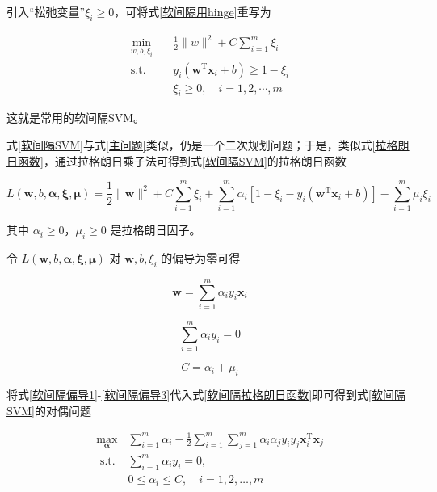 \documentclass{ctexart}
\begin{document}
	引入“松弛变量”$\xi_i\geqslant 0$，可将式\eqref{软间隔用hinge}重写为
	
	\begin{equation}
		\begin{aligned}
			\min _{w, b, \xi_{i}}\quad&\frac{1}{2}\|w\|^{2}+C \sum_{i=1}^{m} \xi_{i}\\
			\text{s.t.}\quad&y_i\left(\boldsymbol{w}^{\mathrm{T}}\boldsymbol{x}_i+b\right)\geqslant 1-\xi_i\\
			&\xi_{i}\geqslant0,\quad i=1,2,\cdots,m
		\end{aligned}
		\label{软间隔SVM}
	\end{equation}
	
	这就是常用的软间隔SVM。
	
	式\eqref{软间隔SVM}与式\eqref{主问题}类似，仍是一个二次规划问题；于是，类似式\eqref{拉格朗日函数}，通过拉格朗日乘子法可得到式\eqref{软间隔SVM}的拉格朗日函数
	
	\begin{equation}
		L(\boldsymbol{w},b,\boldsymbol{\alpha},\boldsymbol{\xi},\boldsymbol{\mu})=\frac{1}{2}\|\boldsymbol{w}\|^2+C\sum_{i=1}^m\xi_i+\sum_{i=1}^m\alpha_i[1-\xi_i-y_i(\boldsymbol{w}^{\mathrm{T}}\boldsymbol{x}_i+b)]-\sum_{i=1}^m\mu_i\xi_i
		\label{软间隔拉格朗日函数}
	\end{equation}
	
	其中 $\alpha_i\geqslant0$，$\mu_i\geqslant0$ 是拉格朗日因子。
	
	令 $L(\boldsymbol{w},b,\boldsymbol{\alpha},\boldsymbol{\xi},\boldsymbol{\mu})$ 对 $\boldsymbol{w},b,\xi_i$ 的偏导为零可得
	
	\begin{equation}
		\boldsymbol{w}=\sum_{i=1}^m\alpha_iy_i\boldsymbol{x}_i
		\label{软间隔偏导1}
	\end{equation}
	
	\begin{equation}
		\sum_{i=1}^m\alpha_iy_i=0
		\label{软间隔偏导2}
	\end{equation}
	
	\begin{equation}
		C=\alpha_i+\mu_i
		\label{软间隔偏导3}
	\end{equation}
	
	将式\eqref{软间隔偏导1}-\eqref{软间隔偏导3}代入式\eqref{软间隔拉格朗日函数}即可得到式\eqref{软间隔SVM}的对偶问题
	
	\begin{equation}
		\begin{aligned}
			\max _{\boldsymbol{\alpha}} & \sum_{i=1}^{m} \alpha_{i}-\frac{1}{2} \sum_{i=1}^{m} \sum_{j=1}^{m} \alpha_{i} \alpha_{j} y_{i} y_{j} \boldsymbol{x}_{i}^\mathrm{T}\boldsymbol{x}_{j} \\
			\text { s.t. } & \sum_{i=1}^{m} \alpha_{i} y_{i}=0, \\
			& 0\leqslant\alpha_{i} \leqslant C, \quad i=1,2, \ldots, m
		\end{aligned}
	\end{equation}
\end{document}
